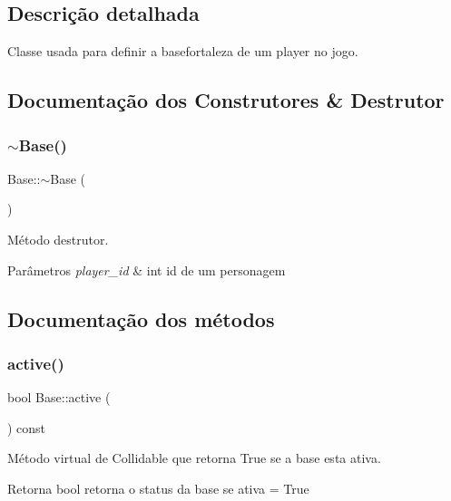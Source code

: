 \subsection{Descrição detalhada}
Classe usada para definir a base\textquotesingle{}fortaleza\textquotesingle{} de um player no jogo. 

\subsection{Documentação dos Construtores \& Destrutor}
\mbox{\label{classBase_a722da881b6c70cfcbde9243abcfbf334}} 
\subsubsection{\texorpdfstring{$\sim$\+Base()}{~Base()}}
{\footnotesize\ttfamily Base\+::$\sim$\+Base (\begin{DoxyParamCaption}{ }\end{DoxyParamCaption})}



Método destrutor. 


\begin{DoxyParams}{Parâmetros}
{\em player\+\_\+id} & int id de um personagem \\
\hline
\end{DoxyParams}


\subsection{Documentação dos métodos}
\mbox{\label{classBase_abc6031bf03072e10f4d8635dd226b01c}} 
\subsubsection{\texorpdfstring{active()}{active()}}
{\footnotesize\ttfamily bool Base\+::active (\begin{DoxyParamCaption}{ }\end{DoxyParamCaption}) const}



Método virtual de Collidable que retorna True se a base esta ativa. 

\begin{DoxyReturn}{Retorna}
bool retorna o status da base se ativa = True 
\end{DoxyReturn}
\mbox{\label{classBase_a28fbf5f8b4e7e774f47298b76268159f}} 
